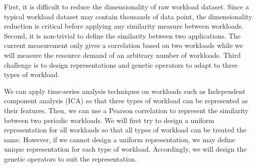 \begin{enumerate}
	First, it is difficult to reduce the dimensionality of raw workload dataset. Since a typical workload dataset may contain thousands of data point, the dimensionality reduction is critical before applying any similarity measure between workloads. Second, it is non-trivial to define the similarity between two applications. The current measurement \cite{Verma:2009wi} only gives a correlation based on two workloads while we will measure the resource demand of an arbitrary number of workloads. Third challenge is to design representations and genetic operators to adapt to three types of workload.

	We can apply time-series analysis techniques on workloads such as Independent component analysis (ICA) so that three types of workload can be represented as their features. Then, we can use a Pearson correlation to represent the similarity between two periodic workloads. We will first try to design a uniform representation for all workloads so that all types of workload can be treated the same. However, if we cannot design a uniform representation, we may define unique representation for each type of workload. Accordingly, we will design the genetic operators to suit the representation. 






\end{enumerate}
